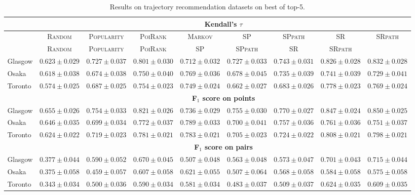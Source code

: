 \begin{table*}[!h]
\caption{Results on trajectory recommendation datasets on best of top-5.}
\centering
\scriptsize
\setlength{\tabcolsep}{3pt} %
\begin{tabular}{l|cc|ccc|ccc} \hline
& \multicolumn{8}{c}{\bf Kendall's $\tau$} \\ \hline
 & \textsc{Random} & \textsc{Popularity} & \textsc{PoiRank} & \textsc{Markov} & \textsc{SP} & \textsc{SPpath} & \textsc{SR} & \textsc{SRpath} \\ \hline
 & \textsc{Random} & \textsc{Popularity} & \textsc{PoiRank} & \textsc{SP} & \textsc{SPpath} & \textsc{SR} & \textsc{SRpath} \\ \hline
Glasgow & $0.623\pm0.029$ & $0.727\pm0.037$ & $0.801\pm0.030$ & $0.712\pm0.032$ & $0.727\pm0.033$ & $0.743\pm0.031$ & $\mathit{0.826\pm0.028}$ & $\mathbf{0.832\pm0.028}$ \\
Osaka & $0.618\pm0.038$ & $0.674\pm0.038$ & $\mathit{0.750\pm0.040}$ & $\mathbf{0.769\pm0.036}$ & $0.678\pm0.045$ & $0.735\pm0.039$ & $0.741\pm0.039$ & $0.729\pm0.041$ \\
Toronto & $0.574\pm0.025$ & $0.687\pm0.025$ & $0.754\pm0.023$ & $0.749\pm0.024$ & $0.662\pm0.027$ & $0.683\pm0.026$ & $\mathbf{0.778\pm0.023}$ & $\mathit{0.769\pm0.024}$ \\
\hline
& \multicolumn{8}{c}{\bf F$_1$ score on points} \\ \hline
Glasgow & $0.655\pm0.026$ & $0.754\pm0.033$ & $0.821\pm0.026$ & $0.736\pm0.029$ & $0.755\pm0.030$ & $0.770\pm0.027$ & $\mathit{0.847\pm0.024}$ & $\mathbf{0.850\pm0.025}$ \\
Osaka & $0.646\pm0.035$ & $0.699\pm0.034$ & $\mathit{0.772\pm0.037}$ & $\mathbf{0.789\pm0.033}$ & $0.700\pm0.041$ & $0.757\pm0.036$ & $0.761\pm0.036$ & $0.751\pm0.037$ \\
Toronto & $0.624\pm0.022$ & $0.719\pm0.023$ & $0.781\pm0.021$ & $0.783\pm0.021$ & $0.705\pm0.023$ & $0.724\pm0.022$ & $\mathbf{0.808\pm0.021}$ & $\mathit{0.798\pm0.021}$ \\
\hline
& \multicolumn{8}{c}{\bf F$_1$ score on pairs} \\ \hline
Glasgow & $0.377\pm0.044$ & $0.590\pm0.052$ & $0.670\pm0.045$ & $0.507\pm0.048$ & $0.563\pm0.048$ & $0.573\pm0.047$ & $\mathit{0.701\pm0.043}$ & $\mathbf{0.715\pm0.044}$ \\
Osaka & $0.375\pm0.058$ & $0.459\pm0.057$ & $\mathit{0.607\pm0.058}$ & $\mathbf{0.621\pm0.055}$ & $0.507\pm0.064$ & $0.568\pm0.058$ & $0.584\pm0.058$ & $0.575\pm0.058$ \\
Toronto & $0.343\pm0.034$ & $0.500\pm0.036$ & $0.590\pm0.034$ & $0.581\pm0.034$ & $0.483\pm0.037$ & $0.509\pm0.037$ & $\mathbf{0.624\pm0.035}$ & $\mathit{0.609\pm0.035}$ \\
\hline
\end{tabular}
\end{table*}


